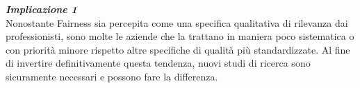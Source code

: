      \begin{center}
	
        \begin{tcolorbox}[width=\textwidth, colframe=black, colback=Gray]
    			\begin{minipage}{\textwidth}
    				\textit{\faCaretSquareORight  \textbf{ Implicazione 1}}\\
    		     Nonostante Fairness sia percepita come una specifica qualitativa di rilevanza dai professionisti, sono molte le aziende che la trattano in maniera poco sistematica o con priorità minore rispetto altre specifiche di qualità più standardizzate. Al fine di invertire definitivamente questa tendenza, nuovi studi di ricerca sono sicuramente necessari e possono fare la differenza.
    			\end{minipage}
		\end{tcolorbox}
	\end{center}
    
